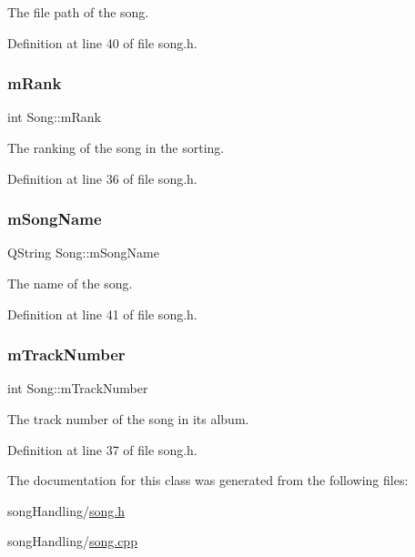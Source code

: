 The file path of the song. 



Definition at line 40 of file song.\+h.

\mbox{\label{class_song_a18b47d2545fc5e7795cad143092c97e7}} 
\subsubsection{\texorpdfstring{m\+Rank}{mRank}}
{\footnotesize\ttfamily int Song\+::m\+Rank\hspace{0.3cm}{\ttfamily [private]}}



The ranking of the song in the sorting. 



Definition at line 36 of file song.\+h.

\mbox{\label{class_song_af7fae22fdde85f62397c5a3618e8e573}} 
\subsubsection{\texorpdfstring{m\+Song\+Name}{mSongName}}
{\footnotesize\ttfamily Q\+String Song\+::m\+Song\+Name\hspace{0.3cm}{\ttfamily [private]}}



The name of the song. 



Definition at line 41 of file song.\+h.

\mbox{\label{class_song_a45f2f019180a08117bc1992f16fdb5f7}} 
\subsubsection{\texorpdfstring{m\+Track\+Number}{mTrackNumber}}
{\footnotesize\ttfamily int Song\+::m\+Track\+Number\hspace{0.3cm}{\ttfamily [private]}}



The track number of the song in its album. 



Definition at line 37 of file song.\+h.



The documentation for this class was generated from the following files\+:\begin{DoxyCompactItemize}
\item 
song\+Handling/\mbox{\hyperlink{song_8h}{song.\+h}}\item 
song\+Handling/\mbox{\hyperlink{song_8cpp}{song.\+cpp}}\end{DoxyCompactItemize}
